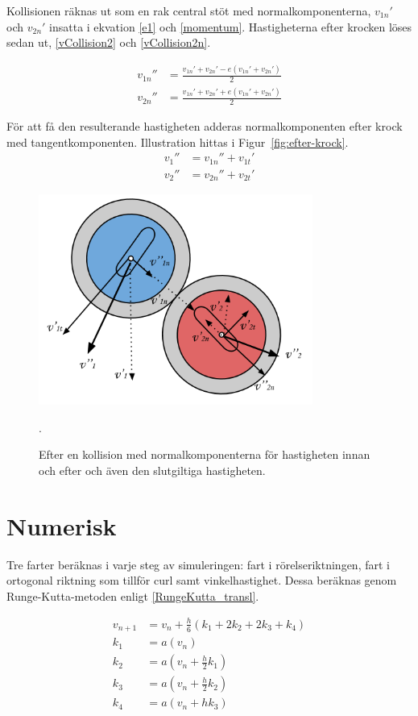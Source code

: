 \documentclass[11pt]{article} %
\begin{document}
Kollisionen räknas ut som en rak central stöt med normalkomponenterna, $v_{1n}'$ och  $v_{2n}'$ insatta i ekvation \eqref{e1} och \eqref{momentum}. Hastigheterna efter krocken löses sedan ut, \eqref{vCollision2} och \eqref{vCollision2n}.

 \begin{align}\label{vCollision2}
 v_{1n}''& = \frac{v_{1n}' + v_{2n}'  - e(v_{1n}' + v_{2n}')}{2} \\
 v_{2n}''& = \frac{v_{1n}' + v_{2n}'  + e(v_{1n}' + v_{2n}')}{2} \label{vCollision2n}
 \end{align}

\pagebreak

För att få den resulterande hastigheten adderas normalkomponenten efter krock med tangentkomponenten. Illustration hittas i Figur~\ref{fig:efter-krock}. 
 \begin{align}\label{vfinal}
v_1''& = v_{1n}'' + v_{1t}'\\
v_2''& = v_{2n}'' + v_{2t}'
 \end{align}

\begin{figure}[ht!]
\centering
\includegraphics[width=90mm]{efter-krock.png}
\caption{Efter en kollision med normalkomponenterna för hastigheten innan och efter och även den slutgiltiga hastigheten.  }.
\label{fig:efter-krock}
\label{overflow}
\end{figure}


\section{Numerisk}
Tre farter beräknas i varje steg av simuleringen: fart i rörelseriktningen, fart i ortogonal riktning som tillför curl samt vinkelhastighet. Dessa beräknas genom Runge-Kutta-metoden enligt \eqref{RungeKutta_transl}. 

 \begin{subequations}\label{RungeKutta_transl}
 \begin{align}
 v_{n+1}& =v_n + \frac{h}{6} (k_1+2 k_2 + 2 k_3 + k_4)\\
 k_1& = a(v_n)\\
 k_2& = a(v_n + \frac{h}{2} k_1)\\
 k_3& = a(v_n + \frac{h}{2} k_2)\\
 k_4& = a(v_n + h k_3)
 \end{align}
\end{subequations}
\end{document}
